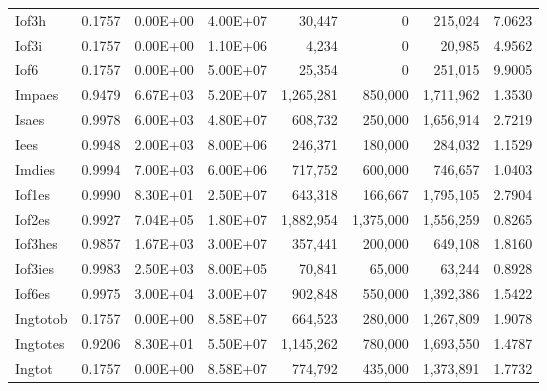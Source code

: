 \begin{table}[H]
\begin{tabular}{lrrrrrrr}
Iof3h & 0.1757 & 0.00E+00 & 4.00E+07 & 30,447 & 0 & 215,024 & 7.0623 \\
Iof3i & 0.1757 & 0.00E+00 & 1.10E+06 & 4,234 & 0 & 20,985 & 4.9562 \\
Iof6 & 0.1757 & 0.00E+00 & 5.00E+07 & 25,354 & 0 & 251,015 & 9.9005 \\
Impaes & 0.9479 & 6.67E+03 & 5.20E+07 & 1,265,281 & 850,000 & 1,711,962 & 1.3530 \\
Isaes & 0.9978 & 6.00E+03 & 4.80E+07 & 608,732 & 250,000 & 1,656,914 & 2.7219 \\
Iees & 0.9948 & 2.00E+03 & 8.00E+06 & 246,371 & 180,000 & 284,032 & 1.1529 \\
Imdies & 0.9994 & 7.00E+03 & 6.00E+06 & 717,752 & 600,000 & 746,657 & 1.0403 \\
Iof1es & 0.9990 & 8.30E+01 & 2.50E+07 & 643,318 & 166,667 & 1,795,105 & 2.7904 \\
Iof2es & 0.9927 & 7.04E+05 & 1.80E+07 & 1,882,954 & 1,375,000 & 1,556,259 & 0.8265 \\
Iof3hes & 0.9857 & 1.67E+03 & 3.00E+07 & 357,441 & 200,000 & 649,108 & 1.8160 \\
Iof3ies & 0.9983 & 2.50E+03 & 8.00E+05 & 70,841 & 65,000 & 63,244 & 0.8928 \\
Iof6es & 0.9975 & 3.00E+04 & 3.00E+07 & 902,848 & 550,000 & 1,392,386 & 1.5422 \\
Ingtotob & 0.1757 & 0.00E+00 & 8.58E+07 & 664,523 & 280,000 & 1,267,809 & 1.9078 \\
Ingtotes & 0.9206 & 8.30E+01 & 5.50E+07 & 1,145,262 & 780,000 & 1,693,550 & 1.4787 \\
Ingtot & 0.1757 & 0.00E+00 & 8.58E+07 & 774,792 & 435,000 & 1,373,891 & 1.7732 \\
\bottomrule
\end{tabular}
\end{table}